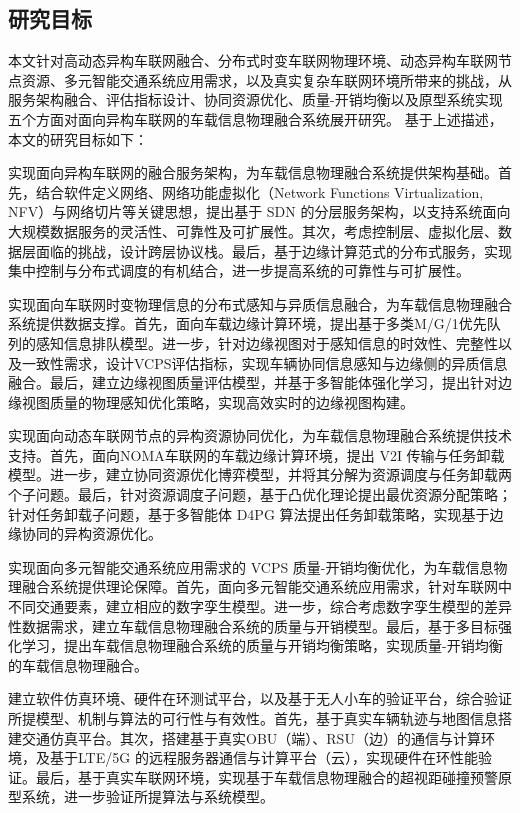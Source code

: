 \subsection{研究目标}

本文针对高动态异构车联网融合、分布式时变车联网物理环境、动态异构车联网节点资源、多元智能交通系统应用需求，以及真实复杂车联网环境所带来的挑战，从服务架构融合、评估指标设计、协同资源优化、质量-开销均衡以及原型系统实现五个方面对面向异构车联网的车载信息物理融合系统展开研究。
基于上述描述，本文的研究目标如下：

 实现面向异构车联网的融合服务架构，为车载信息物理融合系统提供架构基础。首先，结合软件定义网络、网络功能虚拟化（Network Functions Virtualization, NFV）与网络切片等关键思想，提出基于 SDN 的分层服务架构，以支持系统面向大规模数据服务的灵活性、可靠性及可扩展性。其次，考虑控制层、虚拟化层、数据层面临的挑战，设计跨层协议栈。最后，基于边缘计算范式的分布式服务，实现集中控制与分布式调度的有机结合，进一步提高系统的可靠性与可扩展性。

 实现面向车联网时变物理信息的分布式感知与异质信息融合，为车载信息物理融合系统提供数据支撑。首先，面向车载边缘计算环境，提出基于多类M/G/1优先队列的感知信息排队模型。进一步，针对边缘视图对于感知信息的时效性、完整性以及一致性需求，设计VCPS评估指标，实现车辆协同信息感知与边缘侧的异质信息融合。最后，建立边缘视图质量评估模型，并基于多智能体强化学习，提出针对边缘视图质量的物理感知优化策略，实现高效实时的边缘视图构建。

 实现面向动态车联网节点的异构资源协同优化，为车载信息物理融合系统提供技术支持。首先，面向NOMA车联网的车载边缘计算环境，提出 V2I 传输与任务卸载模型。进一步，建立协同资源优化博弈模型，并将其分解为资源调度与任务卸载两个子问题。最后，针对资源调度子问题，基于凸优化理论提出最优资源分配策略；针对任务卸载子问题，基于多智能体 D4PG 算法提出任务卸载策略，实现基于边缘协同的异构资源优化。

 实现面向多元智能交通系统应用需求的 VCPS 质量-开销均衡优化，为车载信息物理融合系统提供理论保障。首先，面向多元智能交通系统应用需求，针对车联网中不同交通要素，建立相应的数字孪生模型。进一步，综合考虑数字孪生模型的差异性数据需求，建立车载信息物理融合系统的质量与开销模型。最后，基于多目标强化学习，提出车载信息物理融合系统的质量与开销均衡策略，实现质量-开销均衡的车载信息物理融合。

 建立软件仿真环境、硬件在环测试平台，以及基于无人小车的验证平台，综合验证所提模型、机制与算法的可行性与有效性。首先，基于真实车辆轨迹与地图信息搭建交通仿真平台。其次，搭建基于真实OBU（端）、RSU（边）的通信与计算环境，及基于LTE/5G 的远程服务器通信与计算平台（云），实现硬件在环性能验证。最后，基于真实车联网环境，实现基于车载信息物理融合的超视距碰撞预警原型系统，进一步验证所提算法与系统模型。

